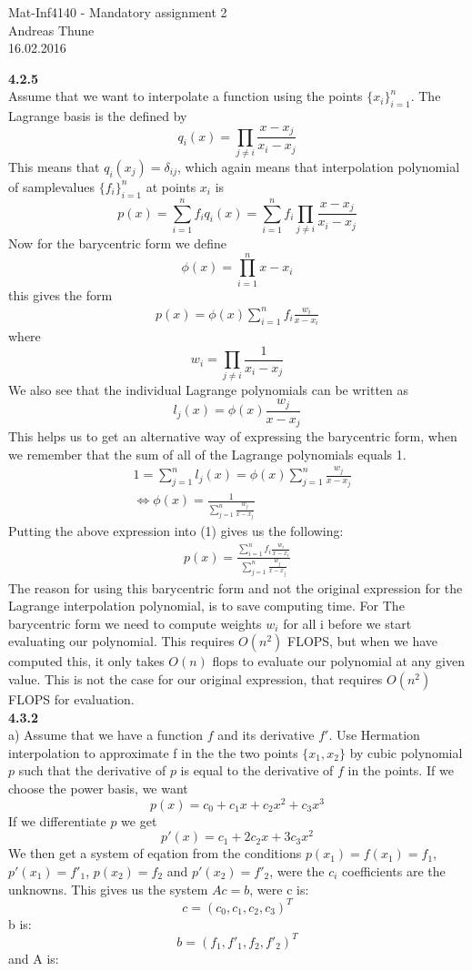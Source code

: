 \documentclass[11pt,a4paper]{report}
\begin{document}
\begin{center}

\LARGE Mat-Inf4140 - Mandatory assignment 2
\\
Andreas Thune
\\
\LARGE
16.02.2016

\end{center}
\textbf{4.2.5}
\\
Assume that we want to interpolate a function using the points $\{ x_i\}_{i=1}^n$. The Lagrange basis is the defined by $$q_i(x) = \prod_{j\neq i} \frac{x-x_j}{x_i-x_j} $$ This means that $q_i(x_j) = \delta_{ij}$, which again means that interpolation polynomial of samplevalues $\{ f_i\}_{i=1}^n$ at points $x_i$ is $$p(x) = \sum_{i=1}^n f_iq_i(x)= \sum_{i=1}^n f_i\prod_{j\neq i} \frac{x-x_j}{x_i-x_j}$$ Now for the barycentric form we define $$\phi(x) = \prod_{i=1}^n x-x_i $$ this gives the form 
\begin{align}
p(x) = \phi(x)\sum_{i=1}^n f_i\frac{w_i}{x-x_i} 
\end{align}
where $$w_i = \prod_{j\neq i} \frac{1}{x_i-x_j}$$
We also see that the individual Lagrange polynomials can be written as $$l_j(x)=\phi(x)\frac{w_j}{x-x_j} $$ This helps us to get an alternative way of expressing the barycentric form, when we remember that the sum of all of the Lagrange polynomials equals 1. 
\begin{align*}
&1=\sum_{j=1}^n l_j(x)= \phi(x)\sum_{j=1}^n \frac{w_j}{x-x_j} \\
&\iff \phi(x) = \frac{1}{\sum_{j=1}^n \frac{w_j}{x-x_j}}
\end{align*} 
Putting the above expression into (1) gives us the following:
\begin{align*}
p(x)=\frac{\sum_{i=1}^n f_i\frac{w_i}{x-x_i}}{\sum_{j=1}^n \frac{w_j}{x-x_j}}
\end{align*}
The reason for using this barycentric form and not the original expression for the Lagrange interpolation polynomial, is to save computing time. For The barycentric form we need to compute weights $w_i$ for all i before we start evaluating our polynomial. This requires $O(n^2)$ FLOPS, but when we have computed this, it only takes $O(n)$ flops to evaluate our polynomial at any given value. This is not the case for our original expression, that requires $O(n^2)$ FLOPS for evaluation. 
\\
\textbf{4.3.2}
\\
a) Assume that we have a function $f$ and its derivative $f'$. Use Hermation interpolation to approximate f in the the two points $\{x_1,x_2\}$ by cubic polynomial $p$ such that the derivative of $p$ is equal to the derivative of $f$ in the points. If we choose the power basis, we want $$p(x)=c_0 + c_1x + c_2x^2 + c_3x^3$$ If we differentiate $p$ we get $$p'(x)=c_1 + 2c_2x + 3c_3x^2$$ We then get a system of eqation from the conditions $p(x_1)=f(x_1)=f_1$, $p'(x_1)=f'_1$, $p(x_2)=f_2$ and $p'(x_2)=f'_2$, were the $c_i$ coefficients are the unknowns. This gives us the system $Ac=b$, were c is: $$c=(c_0,c_1,c_2,c_3)^T$$ b is: $$b=(f_1,f'_1,f_2,f'_2)^T$$ and A is:  
\end{document}
